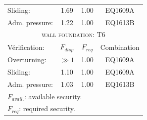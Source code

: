 \begin{center}
\begin{tabular}[H]{|l|c|c|c|}
Sliding:  & 1.69 & 1.00 & EQ1609A\\
Adm. pressure:  & 1.22 & 1.00 & EQ1613B\\
\hline
\multicolumn{4}{|c|}{\textsc{wall foundation: T6}}\\
\hline
Vérification:  & $F_{disp}$ & $F_{req}$ & Combination\\
\hline
Overturning:  & $\gg 1$ & 1.00 & EQ1609A\\
Sliding:  & 1.10 & 1.00 & EQ1609A\\
Adm. pressure:  & 1.03 & 1.00 & EQ1613B\\
\hline
\multicolumn{4}{|l|}{$F_{avail.}$: available security.}\\
\multicolumn{4}{|l|}{$F_{req}$: required security.}\\
\hline
\end{tabular}
\end{center}
